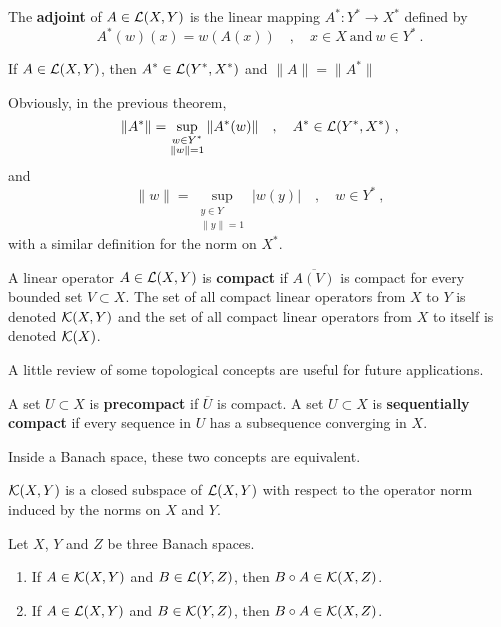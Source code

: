 \begin{defn}
The {\bfseries adjoint} of
$A\in \mathcal{L}(X,Y)$ is the linear mapping
$\displaystyle A^\ast : Y^\ast \rightarrow X^\ast$ defined by
\[
A^\ast(w)(x) = w(A(x)) \quad , \quad x \in X \ \text{and} \ w \in Y^\ast \ .
\]
\end{defn}

\begin{theorem}
If $A \in \mathcal{L}(X,Y)$, then $\displaystyle A^\ast \in \mathcal{L}(Y^\ast, X^\ast)$ and
$\displaystyle \|A\| = \|A^\ast\|$
\end{theorem}

Obviously, in the previous theorem,
\[
\| A^\ast \| =  \sup_{\substack{w\in Y^\ast\\ \|w\|=1}} \|A^\ast(w)\| 
\quad , \quad A^\ast \in \mathcal{L}(Y^\ast,X^\ast) \ ,
\]
and
\[
\| w \| = \sup_{\substack{y\in Y\\ \|y\|=1}} |w(y)| 
\quad , \quad w \in Y^\ast \ ,
\]
with a similar definition for the norm on $\displaystyle X^\ast$.

\begin{defn}
A linear operator $A \in \mathcal{L}(X,Y)$ is
{\bfseries compact} if
$\overline{A(V)}$ is compact for every bounded set $V \subset X$.
The set of all compact linear operators from $X$ to
$Y$ is denoted $\mathcal{K}(X,Y)$ and the set of all compact linear operators from $X$
to itself is denoted $\mathcal{K}(X)$.
\end{defn}

A little review of some topological concepts are useful for future
applications.

\begin{defn}
A set $U \subset X$ is {\bfseries precompact} if
$\overline{U}$ is compact.  A set $U \subset X$ is
{\bfseries sequentially compact}
if every sequence in $U$ has a subsequence converging in $X$.
\end{defn}

Inside a Banach space, these two concepts are equivalent.

\begin{prop} \label{fu_an_Kclose}
$\mathcal{K}(X,Y)$ is a closed subspace of $\mathcal{L}(X,Y)$ with respect to the
operator norm induced by the norms on $X$ and $Y$.
\end{prop}

\begin{prop} \label{fu_an_comp_cont}
Let $X$, $Y$ and $Z$ be three Banach spaces.
\begin{enumerate}
\item If $A \in \mathcal{K}(X,Y)$ and $B \in \mathcal{L}(Y,Z)$, then $B\circ A \in \mathcal{K}(X,Z)$.
\item If $A \in \mathcal{L}(X,Y)$ and $B \in \mathcal{K}(Y,Z)$, then $B\circ A \in \mathcal{K}(X,Z)$.
\end{enumerate}
\end{prop}

